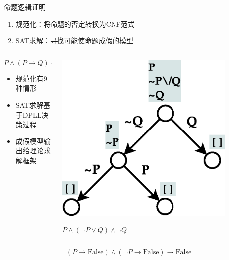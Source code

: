 \documentclass{beamer}
\begin{document}
\begin{frame}[fragile]
  \begin{block}{命题逻辑证明}
    \begin{enumerate}
      \item 规范化：将命题的否定转换为CNF范式
      \item SAT求解：寻找可能使命题成假的模型
    \end{enumerate}
  \end{block}
  \begin{block}{}
    \begin{columns}
      
      \begin{column}{0.6\textwidth}
        $$ P \land ( P \rightarrow Q ) \rightarrow Q $$
        \begin{itemize}
        \item 规范化有9种情形
        \item SAT求解基于DPLL决策过程
        \item 成假模型输出给理论求解框架
        \end{itemize}
      \end{column}

      \begin{column}{0.4\textwidth}
        \includegraphics[width=0.85\textwidth]{sat.eps}

        $P \land (\lnot P \lor Q) \land \lnot Q$
      \end{column}

    \end{columns}
  \end{block}
  \begin{block}{}
    $$(P \rightarrow \mathrm{False}) \land (\lnot P \rightarrow \mathrm{False}) \rightarrow \mathrm{False}$$
  \end{block}
\end{frame}
\end{document}
